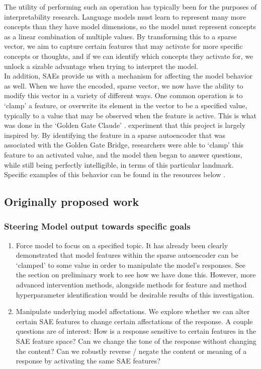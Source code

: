 \documentclass{article}
\begin{document}
The utility of performing such an operation has typically been for the purposes of interpretability research. Language models must learn to represent many more concepts than they have model dimensions, so the model must represent concepts as a linear combination of multiple values. By transforming this to a sparse vector, we aim to capture certain features that may activate for more specific concepts or thoughts, and if we can identify which concepts they activate for, we unlock a sizable advantage when trying to interpret the model.\\

In addition, SAEs provide us with a mechanism for affecting the model behavior as well. When we have the encoded, sparse vector, we now have the ability to modify this vector in a variety of different ways. One common operation is to ‘clamp’ a feature, or overwrite its element in the vector to be a specified value, typically to a value that may be observed when the feature is active. This is what was done in the ‘Golden Gate Claude’ \cite{ggc}. experiment that this project is largely inspired by. By identifying the feature in a sparse autoencoder that was associated with the Golden Gate Bridge, researchers were able to ‘clamp’ this feature to an activated value, and the model then began to answer questions, while still being perfectly intelligible, in terms of this particular landmark. Specific examples of this behavior can be found in the resources below \cite{basicsteering}.


\subsection{Originally proposed work}
\subsubsection{Steering Model output towards specific goals}
\begin{enumerate}[label=\alph*]
    \item Force model to focus on a specified topic.
It has already been clearly demonstrated that model features within the sparse autoencoder can be ‘clamped’ to some value in order to manipulate the model’s responses. See the section on preliminary work to see how we have done this. However, more advanced intervention methods, alongside methods for feature and method hyperparameter identification would be desirable results of this investigation.

\item Manipulate underlying model affectations.
We explore whether we can alter certain SAE features to change certain affectations of the response. A couple questions are of interest: How is a response sensitive to certain features in the SAE feature space? Can we change the tone of the response without changing the content? Can we robustly reverse / negate the content or meaning of a response by activating the same SAE features?
\end{enumerate}
\end{document}
